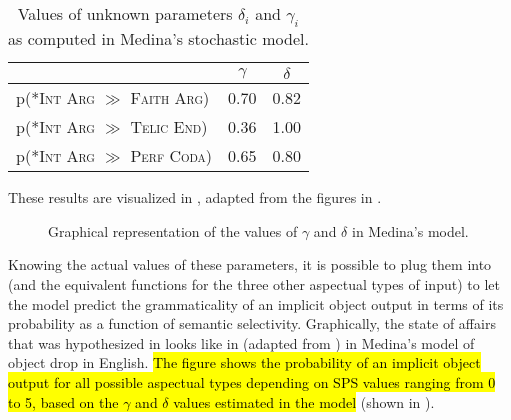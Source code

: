 \begin{table}[htb] %
\caption{Values of unknown parameters $\delta_i$ and $\gamma_i$ as computed in Medina's stochastic model.}
\begin{tabular}{l|cc}
                                                                                & $\gamma$ & $\delta$ \\
                                                                                \hline
p(\textsc{*Int Arg} $\gg$ \textsc{Faith Arg}) & 0.70        & 0.82        \\
p(\textsc{*Int Arg} $\gg$ \textsc{Telic End}) & 0.36        & 1.00        \\
p(\textsc{*Int Arg} $\gg$ \textsc{Perf Coda}) & 0.65        & 0.80       
\end{tabular}
\end{table}

These results are visualized in , adapted from the figures in \textcite[143-144]{Medina2007}.

\begin{figure}[htb]
\caption{Graphical representation of the values of $\gamma$ and $\delta$ in Medina's model.}
\end{figure}

Knowing the actual values of these parameters, it is possible to plug them into  (and the equivalent functions for the three other aspectual types of input) to let the model predict the grammaticality of an implicit object output in terms of its probability as a function of semantic selectivity. Graphically, the state of affairs that was hypothesized in  looks like in  (adapted from \textcite[145]{Medina2007}) in Medina's model of object drop in English. \hl{The figure shows the probability of an implicit object output for all possible aspectual types depending on SPS values ranging from 0 to 5, based on the $\gamma$ and $\delta$ values estimated in the model} (shown in ).


